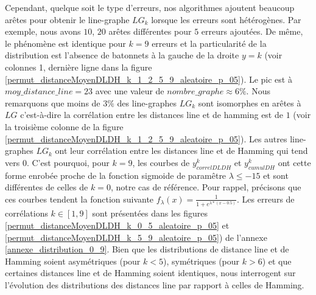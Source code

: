 Cependant, quelque soit le type d'erreurs, nos algorithmes ajoutent beaucoup ar\^etes pour obtenir le line-graphe $LG_k$ lorsque les erreurs sont h\'et\'erog\`enes. Par exemple, nous avons $10$, $20$ ar\^etes diff\'erentes  pour $5$ erreurs ajout\'ees.
\newline
De m\^eme, le ph\'enom\`ene est identique pour $k  = 9$ erreurs et la particularit\'e de la distribution est l'absence de batonnets \`a la gauche de la droite $y = k$ (voir colonnes 1, derni\`ere ligne dans la figure \ref{permut_distanceMoyenDLDH_k_1_2_5_9_aleatoire_p_05}).
Le pic est \`a $moy\_distance\_line = 23$ avec une valeur de $nombre\_graphe \approx 6 \%$.
Nous remarquons que moins de $3\%$ des line-graphes $LG_k$ sont isomorphes  en ar\^etes \`a $LG$ c'est-\`a-dire la corr\'elation entre les distances line et de hamming est de $1$ (voir la troisi\`eme colonne de la figure \ref{permut_distanceMoyenDLDH_k_1_2_5_9_aleatoire_p_05}). 
Les autres line-graphes $LG_k$ ont leur corr\'elation entre les distances line et de Hamming qui tend vers $0$.  C'est pourquoi, pour $k=9$, les courbes de  $y_{correlDLDH}^{k}$ et $y_{cumulDH}^{k}$ ont cette forme enrob\'ee proche de la fonction  sigmoide de param\^etre $\lambda \le -15$  et sont diff\'erentes de celles de $k=0$, notre cas de r\'ef\'erence. Pour rappel, pr\'ecisons que ces courbes  tendent la fonction suivante $f_{\lambda}(x) = \frac{1}{1+e^{\lambda * (x-0.5)}}$.\newline
Les erreurs de corr\'elations $k \in [1,9]$ sont pr\'esent\'ees dans les figures \ref{permut_distanceMoyenDLDH_k_0_5_aleatoire_p_05} et  \ref{permut_distanceMoyenDLDH_k_5_9_aleatoire_p_05}) de l'annexe \ref{annexe_distribution_0_9}.
\newline
Bien que les distributions de distance line et de Hamming soient asym\'etriques (pour $k < 5$), sym\'etriques (pour $k>6$) et que certaines distances line et de Hamming soient identiques, nous interrogent sur l'\'evolution des distributions des distances line par rapport \`a celles de Hamming. 



